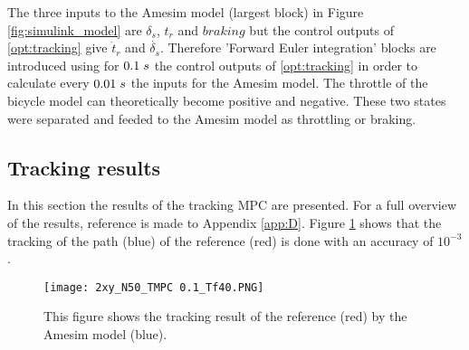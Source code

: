 The three inputs to the Amesim model (largest block)  in Figure \ref{fig:simulink_model} are $\delta_s$, $t_r$ and $braking$ but the control outputs of \ref{opt:tracking} give $\dot{t}_r$ and $\dot{\delta_s}$. Therefore 'Forward Euler integration' blocks are introduced using for $0.1\hspace{1mm}s$ the control outputs of \ref{opt:tracking} in order to calculate every $0.01\hspace{1mm}s$ the inputs for the Amesim model. The throttle of the bicycle model can theoretically become positive and negative. These two states were separated and feeded to the Amesim model as throttling or braking. 


\subsection{Tracking results} 
\label{s:tracking_results}

In this section the results of the tracking MPC are presented. For a full overview of the results, reference is made to Appendix \ref{app:D}. Figure \ref{fig:xy_mpc} shows that the tracking of the path (blue) of the reference (red) is done with an accuracy of $10^{-3}$. 

\begin{figure}[h!]
	\centering
	\texttt{[image: 2xy\_N50\_TMPC 0.1\_Tf40.PNG]}
	\caption{This figure shows the tracking result of the reference (red) by the Amesim model (blue).}	
	\label{fig:xy_mpc}
\end{figure}

